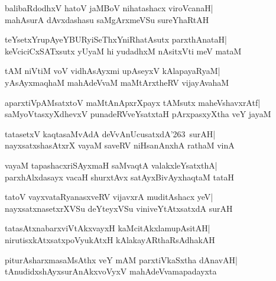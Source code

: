 \documentclass[twoside,12pt,openright]{book}
\def\S{\char'263}
\newcounter{shloka}[chapter]
\begin{document}
\begin{shloka}%
balibaRdodhxV hatoV jaMBoV nihatashacx viroVcanaH|\\
mahAsurA dAvxdashasu saMgArxmeVSu sureYhaRtAH
\end{shloka}

\begin{shloka}%
teYsetxYrupAyeYBURyiSeThxYniRhatAsutx parxthAnataH|\\
keVciciCxSATxsutx yUyaM hi yudadhxM nAsitxVti meV mataM
\end{shloka}

\begin{shloka}%
tAM niVtiM voV vidhAsAyxmi upAseyxV kAlapayaRyaM|\\
yAsAyxmaqhaM mahAdeVvaM maMtArxtheRV vijayAvahaM
\end{shloka}

\begin{shloka}%
aparxtiVpAMsatxtoV maMtAnApxrXpayx tAMsutx maheVshavxrAtf|\\
saMyoVtasxyXdhevxV punadeRVveYsatxtaH pArxpasxyXtha veY jayaM 
\end{shloka}

\begin{shloka}%
tatasetxV kaqtasaMvAdA deVvAnUcusatxdA\S \ surAH|\\
nayxsatxshasAtxrX vayaM saveRV niHsanAnxhA rathaM vinA
\end{shloka}

\begin{shloka}%
vayaM tapashacxriSAyxmaH saMvaqtA valakxleYsatxthA|\\
parxhAlxdasayx vacaH shurxtAvx satAyxBivAyxhaqtaM tataH
\end{shloka}

\begin{shloka}%
tatoV vayxvataRyanasxveRV vijavxrA muditAshacx yeV|\\
nayxsatxnasetxrXVSu deYteyxVSu viniveYtAtxsatxdA surAH
\end{shloka}

\begin{shloka}%
tatasAtxnabarxviVtAkxvayxH kaMcitAkxlamupAsitAH|\\
nirutisxkAtxsatxpoVyukAtxH kAlakayARthaRsAdhakAH
\end{shloka}

\begin{shloka}%
piturAsharxmasaMsAthx veY mAM parxtiVkaSxtha dAnavAH|\\
tAnudidxshAyxsurAnAkxvoVyxV mahAdeVvamapadayxta
\end{shloka}
\end{document}
